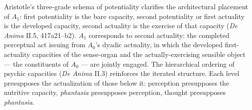 \documentclass{article}
\begin{document}
Aristotle's three-grade schema of potentiality clarifies the architectural placement of $A_1$: first potentiality is the bare capacity, second potentiality or first actuality is the developed capacity, second actuality is the exercise of that capacity (\textit{De Anima} II.5, 417a21--b2). $A_1$ corresponds to second actuality: the completed perceptual act issuing from $A_0$'s dyadic actuality, in which the developed first-actuality capacities of the sense-organ and the actually-exercising sensible object --- the constituents of $A_0$ --- are jointly engaged. The hierarchical ordering of psychic capacities (\textit{De Anima} II.3) reinforces the iterated structure. Each level presupposes the actualization of those below it: perception presupposes the nutritive capacity, \textit{phantasia} presupposes perception, thought presupposes \textit{phantasia}.
\end{document}
